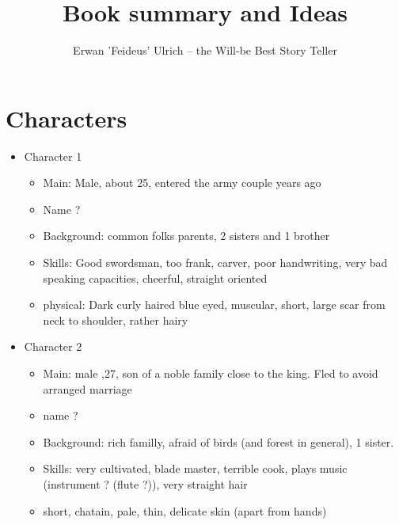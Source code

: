 \documentclass{article}
\begin{document}
\title{Book summary and Ideas}
\author{Erwan 'Feideus' Ulrich -- the Will-be Best Story Teller }
\maketitle

\section{Characters}
\begin{itemize}
\item{Character 1}
	\begin{itemize}
	\item{Main: Male, about 25, entered the army couple years ago}
	\item{Name ?}
	\item{Background: common folks parents, 2 sisters and 1 brother}
	\item{Skills: Good swordsman, too frank, carver, poor handwriting, very bad speaking capacities, cheerful, straight oriented}
	\item{physical: Dark curly haired blue eyed, muscular, short, large scar from neck to shoulder, rather hairy}
	\end{itemize}

\item{Character 2}
	\begin{itemize}
	\item{Main: male ,27, son of a noble family close to the king. Fled to avoid arranged marriage}
	\item{name ?}
	\item{Background: rich familly, afraid of birds (and forest in general), 1 sister.}
	\item{Skills: very cultivated, blade master, terrible cook, plays music (instrument ? (flute ?)), very straight hair  }
	\item{short, chatain, pale, thin, delicate skin (apart from hands)}
	\end{itemize}
\end{itemize}
\end{document}

